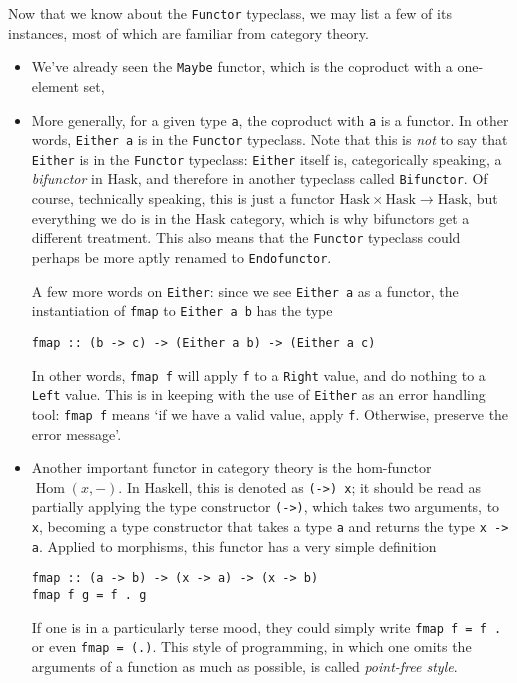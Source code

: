 \documentclass[11pt]{article}
\theoremstyle{nonumberplain}
\newcommand{\Hask}{\mathrm{Hask}}
\newcommand{\blank}{{-}}
\DeclareMathOperator{\Hom}{Hom}
\newcommand*\lsin{\lstinline}
\begin{document}
Now that we know about the \lsin|Functor| typeclass, we may list a few of its instances, most of which are familiar from category theory.
\begin{itemize}
\item We've already seen the \lsin|Maybe| functor, which is the coproduct with a one-element set,
\item More generally, for a given type \lsin|a|, the coproduct with \lsin|a| is a functor. In other words, \lsin|Either a| is in the \lsin|Functor| typeclass. Note that this is \emph{not} to say that \lsin|Either| is in the \lsin|Functor| typeclass: \lsin|Either| itself is, categorically speaking, a \emph{bifunctor} in $\Hask$, and therefore in another typeclass called \lsin|Bifunctor|. Of course, technically speaking, this is just a functor $\Hask \times \Hask \to \Hask$, but everything we do is in the $\Hask$ category, which is why bifunctors get a different treatment. This also means that the \lsin|Functor| typeclass could perhaps be more aptly renamed to \lsin|Endofunctor|.

A few more words on \lsin|Either|: since we see \lsin|Either a| as a functor, the instantiation of \lsin|fmap| to \lsin|Either a b| has the type
\begin{lstlisting}
fmap :: (b -> c) -> (Either a b) -> (Either a c)
\end{lstlisting}

In other words, \lsin|fmap f| will apply \lsin|f| to a \lsin|Right| value, and do nothing to a \lsin|Left| value. This is in keeping with the use of \lsin|Either| as an error handling tool: \lsin|fmap f| means `if we have a valid value, apply \lsin|f|. Otherwise, preserve the error message'.

\item Another important functor in category theory is the hom-functor $\Hom(x, \blank)$. In Haskell, this is denoted as \lsin|(->) x|; it should be read as partially applying the type constructor \lsin|(->)|, which takes two arguments, to \lsin|x|, becoming a type constructor that takes a type \lsin|a| and returns the type \lsin|x -> a|. Applied to morphisms, this functor has a very simple definition
\begin{lstlisting}
fmap :: (a -> b) -> (x -> a) -> (x -> b)
fmap f g = f . g
\end{lstlisting}

If one is in a particularly terse mood, they could simply write \lsin|fmap f = f .| or even \lsin|fmap = (.)|. This style of programming, in which one omits the arguments of a function as much as possible, is called \emph{point-free style}.


\end{itemize}
\end{document}
